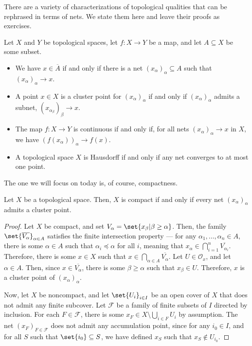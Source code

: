 \documentclass[10pt]{mypackage}
\begin{document}
There are a variety of characterizations of topological qualities that can be rephrased in terms of nets. We state them here and leave their proofs as exercises.
\begin{theorem}
  Let $X$ and $Y$ be topological spaces, let $f\colon X\rightarrow Y$ be a map, and let $A\subseteq X$ be some subset.
  \begin{itemize}
    \item We have $x\in \overline{A}$ if and only if there is a net $\left( x_{\alpha} \right)_{\alpha}\subseteq A$ such that $\left( x_{\alpha} \right)_{\alpha}\rightarrow x$.
    \item A point $x\in X$ is a cluster point for $\left( x_{\alpha} \right)_{\alpha}$ if and only if $\left( x_{\alpha} \right)_{\alpha}$ admits a subnet, $\left( x_{\alpha_{\beta}} \right)_{\beta}\rightarrow x$.
    \item The map $f\colon X\rightarrow Y$ is continuous if and only if, for all nets $\left( x_{\alpha} \right)_{\alpha}\rightarrow x$ in $X$, we have $\left( f\left( x_{\alpha} \right) \right)_{\alpha}\rightarrow f\left( x \right)$.
    \item A topological space $X$ is Hausdorff if and only if any net converges to at most one point.
  \end{itemize}
\end{theorem}
The one we will focus on today is, of course, compactness.
\begin{theorem}
  Let $X$ be a topological space. Then, $X$ is compact if and only if every net $\left( x_{\alpha} \right)_{\alpha}$ admits a cluster point.
\end{theorem}
\begin{proof}
  Let $X$ be compact, and set $V_{\alpha} = \set{x_{\beta} | \beta\geq \alpha}$. Then, the family $ \set{\overline{V_{\alpha}}}_{\alpha \in A} $ satisfies the finite intersection property --- for any $\alpha_1,\dots,\alpha_n\in A$, there is some $\alpha\in A$ such that $\alpha_i\preceq \alpha$ for all $i$, meaning that $x_{\alpha}\in \bigcap_{i=1}^{n} \overline{V_{\alpha_i}}$. Therefore, there is some $x\in X$ such that $x\in \bigcap_{\alpha\in A} \overline{V_{\alpha}}$. Let $U\in \mathcal{O}_{x}$, and let $\alpha \in A$. Then, since $x\in \overline{V_{\alpha}}$, there is some $\beta \geq \alpha$ such that $x_{\beta}\in U$. Therefore, $x$ is a cluster point of $\left( x_{\alpha} \right)_{\alpha}$.\newline

  Now, let $X$ be noncompact, and let $\set{U_{i}}_{i\in I}$ be an open cover of $X$ that does not admit any finite subcover. Let $\mathcal{F}$ be a family of finite subsets of $I$ directed by inclusion. For each $F\in \mathcal{F}$, there is some $x_{F}\in X\setminus \bigcup_{i\in F}U_i$ by assumption. The net $\left( x_F \right)_{F\in \mathcal{F}}$ does not admit any accumulation point, since for any $i_0\in I$, and for all $S$ such that $\set{i_0}\subseteq S$, we have defined $x_{S}$ such that $x_S\notin U_{i_0}$.
\end{proof}
\end{document}
